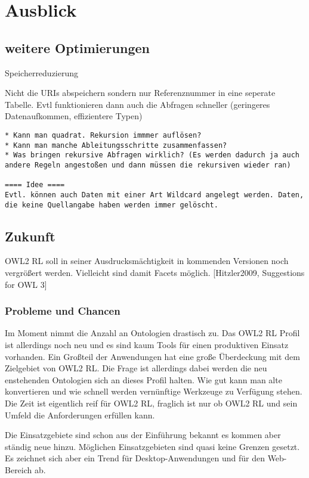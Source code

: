 \chapter{Ausblick}
\label{kapitel-ausblick}

\section{weitere Optimierungen}
Speicherreduzierung

Nicht die URIs abspeichern sondern nur Referenznummer in eine seperate Tabelle. Evtl funktionieren dann auch die Abfragen schneller (geringeres Datenaufkommen, effizientere Typen)

\begin{verbatim} 
* Kann man quadrat. Rekursion immmer auflösen?
* Kann man manche Ableitungsschritte zusammenfassen?
* Was bringen rekursive Abfragen wirklich? (Es werden dadurch ja auch andere Regeln angestoßen und dann müssen die rekursiven wieder ran)

==== Idee ====
Evtl. können auch Daten mit einer Art Wildcard angelegt werden. Daten, die keine Quellangabe haben werden immer gelöscht.

\end{verbatim}

\section{Zukunft}
OWL2 RL soll in seiner Ausdrucksmächtigkeit in kommenden Versionen noch vergrößert werden. Vielleicht sind damit Facets möglich. [Hitzler2009, Suggestions for OWL 3]

\subsection{Probleme und Chancen}
Im Moment nimmt die Anzahl an Ontologien drastisch zu. Das OWL2 RL Profil ist allerdings noch neu und es sind kaum Tools für einen produktiven Einsatz vorhanden. Ein Großteil der Anwendungen hat eine große Überdeckung mit dem Zielgebiet von OWL2 RL. Die Frage ist allerdings dabei werden die neu enstehenden Ontologien sich an dieses Profil halten. Wie gut kann man alte konvertieren und wie schnell werden vernünftige Werkzeuge zu Verfügung stehen. Die Zeit ist eigentlich reif für OWL2 RL, fraglich ist nur ob OWL2 RL und sein Umfeld die Anforderungen erfüllen kann.

Die Einsatzgebiete sind schon aus der Einführung bekannt es kommen aber ständig neue hinzu. Möglichen Einsatzgebieten sind quasi keine Grenzen gesetzt. Es zeichnet sich aber ein Trend für Desktop-Anwendungen und für den Web-Bereich ab.